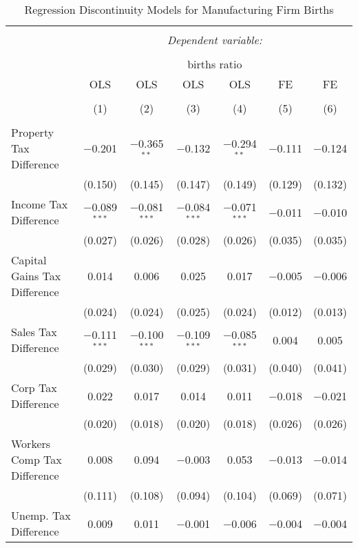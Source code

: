 
\begin{table}[!htbp] \centering 
  \caption{Regression Discontinuity Models for  Manufacturing Firm Births} 
  \label{31-33rd} 
\begin{tabular}{@{\extracolsep{5pt}}lcccccc} 
\\[-1.8ex]\hline 
\hline \\[-1.8ex] 
 & \multicolumn{6}{c}{\textit{Dependent variable:}} \\ 
\cline{2-7} 
\\[-1.8ex] & \multicolumn{6}{c}{births ratio} \\ 
 & OLS & OLS & OLS & OLS & FE & FE \\ 
\\[-1.8ex] & (1) & (2) & (3) & (4) & (5) & (6)\\ 
\hline \\[-1.8ex] 
 Property Tax Difference & $-$0.201 & $-$0.365$^{**}$ & $-$0.132 & $-$0.294$^{**}$ & $-$0.111 & $-$0.124 \\ 
  & (0.150) & (0.145) & (0.147) & (0.149) & (0.129) & (0.132) \\ 
  Income Tax Difference & $-$0.089$^{***}$ & $-$0.081$^{***}$ & $-$0.084$^{***}$ & $-$0.071$^{***}$ & $-$0.011 & $-$0.010 \\ 
  & (0.027) & (0.026) & (0.028) & (0.026) & (0.035) & (0.035) \\ 
  Capital Gains Tax Difference & 0.014 & 0.006 & 0.025 & 0.017 & $-$0.005 & $-$0.006 \\ 
  & (0.024) & (0.024) & (0.025) & (0.024) & (0.012) & (0.013) \\ 
  Sales Tax Difference & $-$0.111$^{***}$ & $-$0.100$^{***}$ & $-$0.109$^{***}$ & $-$0.085$^{***}$ & 0.004 & 0.005 \\ 
  & (0.029) & (0.030) & (0.029) & (0.031) & (0.040) & (0.041) \\ 
  Corp Tax Difference & 0.022 & 0.017 & 0.014 & 0.011 & $-$0.018 & $-$0.021 \\ 
  & (0.020) & (0.018) & (0.020) & (0.018) & (0.026) & (0.026) \\ 
  Workers Comp Tax Difference & 0.008 & 0.094 & $-$0.003 & 0.053 & $-$0.013 & $-$0.014 \\ 
  & (0.111) & (0.108) & (0.094) & (0.104) & (0.069) & (0.071) \\ 
  Unemp. Tax Difference & 0.009 & 0.011 & $-$0.001 & $-$0.006 & $-$0.004 & $-$0.004 \\ 

\end{tabular}
\end{table}

